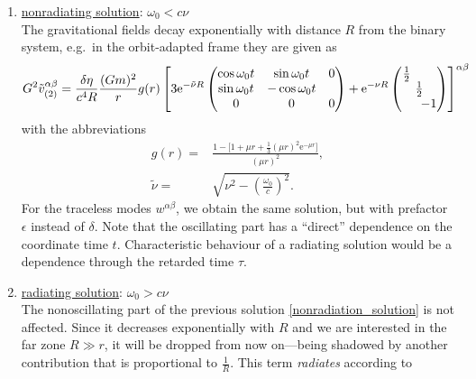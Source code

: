 \begin{enumerate}
  \item \underline{nonradiating solution}: $\omega_0 < c\nu$ \\ The gravitational fields decay exponentially with distance $R$ from the binary system, e.g.~in the orbit-adapted frame they are given as
    \begin{equation}\label{nonradiation_solution}
      G^2\tilde v^{\alpha\beta}_{(2)} = \frac{\delta\eta}{c^4R}\frac{(Gm)^2}{r} g(r) \left\lbrack 3\mathrm e^{-\tilde\nu R}\begin{pmatrix}\operatorname{cos}\omega_0t & \operatorname{sin}\omega_0t & 0 \\ \operatorname{sin}\omega_0t & -\operatorname{cos}\omega_0t \\ 0 & 0 & 0 \end{pmatrix} + \mathrm e^{-\nu R} \begin{pmatrix}\frac{1}{2}\hspace{2em}\\\hspace{0.5em}\frac{1}{2}\hspace{0.5em}\\\hspace{1.5em}-1\end{pmatrix}\right\rbrack^{\alpha\beta}
    \end{equation}
    with the abbreviations
    \begin{equation}
      \begin{aligned}
        g(r) = {} & \frac{1 - \lbrack 1 + \mu r + \frac{1}{3}(\mu r)^2\mathrm e^{-\mu r}\rbrack}{(\mu r)^2}, \\
        \tilde\nu = {} & \sqrt{\nu^2 - \left(\frac{\omega_0}{c}\right)^2}.
      \end{aligned}
    \end{equation}
    For the traceless modes $w^{\alpha\beta}$, we obtain the same solution, but with prefactor $\epsilon$ instead of $\delta$. Note that the oscillating part has a ``direct'' dependence on the coordinate time $t$. Characteristic behaviour of a radiating solution would be a dependence through the retarded time $\tau$.
  \item \underline{radiating solution}: $\omega_0 > c\nu$ \\ The nonoscillating part of the previous solution \eqref{nonradiation_solution} is not affected. Since it decreases exponentially with $R$ and we are interested in the far zone $R \gg r$, it will be dropped from now on---being shadowed by another contribution that is proportional to $\frac{1}{R}$. This term \emph{radiates} according to

\end{enumerate}
